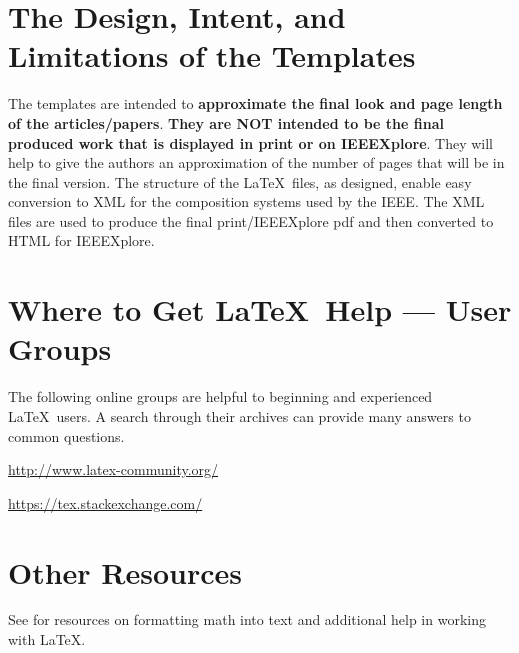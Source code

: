 
\section{The Design, Intent, and \\ Limitations of the Templates}
\label{sec:TheDesign}

The templates are intended to {\bf{approximate the final look and page length of the articles/papers}}. {\bf{They are NOT intended to be the final produced work that is displayed in print or on IEEEXplore\textsuperscript{\textregistered}}}. They will help to give the authors an approximation of the number of pages that will be in the final version. The structure of the \LaTeX\ files, as designed, enable easy conversion to XML for the composition systems used by the IEEE. The XML files are used to produce the final print/IEEEXplore pdf and then converted to HTML for IEEEXplore.


\section{Where to Get \LaTeX \ Help --- User Groups}
\label{sec:UserGroups}

The following online groups are helpful to beginning and experienced \LaTeX\ users. A search through their archives can provide many answers to common questions.
\begin{list}{}{}
\item{\url{http://www.latex-community.org/}} 
\item{\url{https://tex.stackexchange.com/} }
\end{list}


\section{Other Resources}
\label{sec:OtherResources}

See \cite{RPS} for resources on formatting math into text and additional help in working with \LaTeX .



